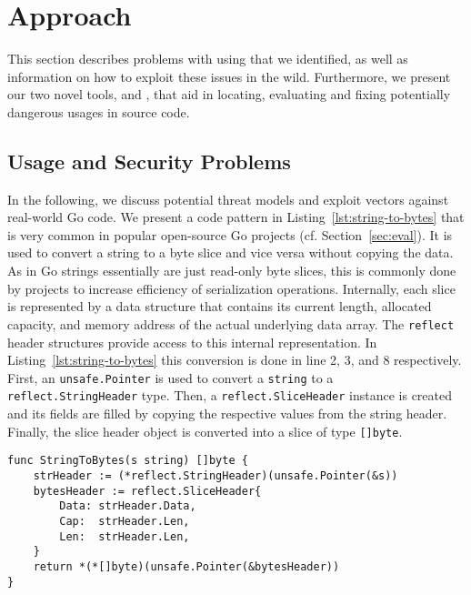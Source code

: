 \section{Approach}
\label{sec:appr}

This section describes problems with using \unsafe{} that we identified, as well as information on how to exploit these issues in the wild.
Furthermore, we present our two novel tools, \toolUsage{} and \toolSA{}, that aid in locating, evaluating and fixing potentially dangerous \unsafe{} usages in source code.



\subsection{Usage and Security Problems}

In the following, we discuss potential threat models and exploit vectors against real-world \unsafe{} Go code.
We present a code pattern in Listing~\ref{lst:string-to-bytes} that is very common in popular open-source Go projects (cf. Section~\ref{sec:eval}).
It is used to convert a string to a byte slice and vice versa without copying the data.
As in Go strings essentially are just read-only byte slices, this is commonly done by projects to increase efficiency of serialization operations. %
Internally, each slice is represented by a data structure that contains its current length, allocated capacity, and memory address of the actual underlying data array.
The \texttt{reflect} header structures provide access to this internal representation.
In Listing~\ref{lst:string-to-bytes} this conversion is done in line 2, 3, and 8 respectively.
First, an \texttt{unsafe.Pointer} is used to convert a \texttt{string} to a \texttt{reflect.StringHeader} type.
Then, a \texttt{reflect.SliceHeader} instance is created and its fields are filled by copying the respective values from the string header.
Finally, the slice header object is converted into a slice of type \texttt{[]byte}.

\begin{lstlisting}[language=Golang, label=lst:string-to-bytes, caption=Conversion from string to bytes using \unsafe{}, float, belowskip=-1.5em]
func StringToBytes(s string) []byte {
	strHeader := (*reflect.StringHeader)(unsafe.Pointer(&s))
	bytesHeader := reflect.SliceHeader{
		Data: strHeader.Data,
		Cap:  strHeader.Len,
		Len:  strHeader.Len,
	}
	return *(*[]byte)(unsafe.Pointer(&bytesHeader))
}
\end{lstlisting}


